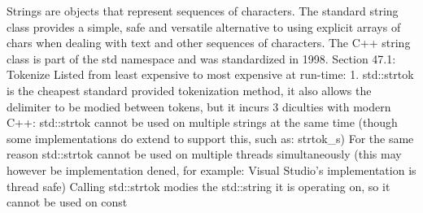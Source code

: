 Strings are objects that represent sequences of characters. The standard
string class provides a simple, safe and versatile alternative to using
explicit arrays of chars when dealing with text and other sequences of
characters. The C++ string class is part of the std namespace and was
standardized in 1998. Section 47.1: Tokenize Listed from least expensive
to most expensive at run-time: 1. std::strtok is the cheapest standard
provided tokenization method, it also allows the delimiter to be modied
between tokens, but it incurs 3 diculties with modern C++: std::strtok
cannot be used on multiple strings at the same time (though some
implementations do extend to support this, such as: strtok\_s) For the
same reason std::strtok cannot be used on multiple threads
simultaneously (this may however be implementation dened, for example:
Visual Studio's implementation is thread safe) Calling std::strtok
modies the std::string it is operating on, so it cannot be used on const
